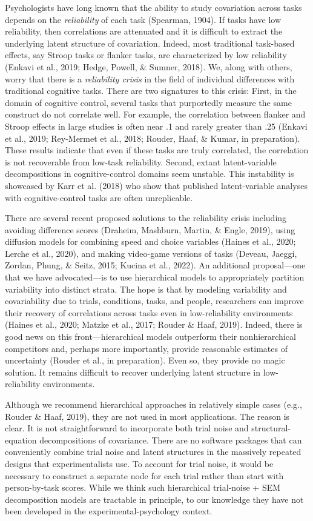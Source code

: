 \documentclass[
  ,man]{apa6}
\begin{document}
Psychologists have long known that the ability to study covariation across tasks depends on the \emph{reliability} of each task (Spearman, 1904). If tasks have low reliability, then correlations are attenuated and it is difficult to extract the underlying latent structure of covariation. Indeed, most traditional task-based effects, say Stroop tasks or flanker tasks, are characterized by low reliability (Enkavi et al., 2019; Hedge, Powell, \& Sumner, 2018). We, along with others, worry that there is a \emph{reliability crisis} in the field of individual differences with traditional cognitive tasks. There are two signatures to this crisis: First, in the domain of cognitive control, several tasks that purportedly measure the same construct do not correlate well. For example, the correlation between flanker and Stroop effects in large studies is often near .1 and rarely greater than .25 (Enkavi et al., 2019; Rey-Mermet et al., 2018; Rouder, Haaf, \& Kumar, in preparation). These results indicate that even if these tasks are truly correlated, the correlation is not recoverable from low-task reliability. Second, extant latent-variable decompositions in cognitive-control domains seem unstable. This instability is showcased by Karr et al. (2018) who show that published latent-variable analyses with cognitive-control tasks are often unreplicable.

There are several recent proposed solutions to the reliability crisis including avoiding difference scores (Draheim, Mashburn, Martin, \& Engle, 2019), using diffusion models for combining speed and choice variables (Haines et al., 2020; Lerche et al., 2020), and making video-game versions of tasks (Deveau, Jaeggi, Zordan, Phung, \& Seitz, 2015; Kucina et al., 2022). An additional proposal---one that we have advocated---is to use hierarchical models to appropriately partition variability into distinct strata. The hope is that by modeling variability and covariability due to trials, conditions, tasks, and people, researchers can improve their recovery of correlations across tasks even in low-reliability environments (Haines et al., 2020; Matzke et al., 2017; Rouder \& Haaf, 2019). Indeed, there is good news on this front---hierarchical models outperform their nonhierarchical competitors and, perhaps more importantly, provide reasonable estimates of uncertainty (Rouder et al., in preparation). Even so, they provide no magic solution. It remains difficult to recover underlying latent structure in low-reliability environments.

Although we recommend hierarchical approaches in relatively simple cases (e.g., Rouder \& Haaf, 2019), they are not used in most applications. The reason is clear. It is not straightforward to incorporate both trial noise and structural-equation decompositions of covariance. There are no software packages that can conveniently combine trial noise and latent structures in the massively repeated designs that experimentalists use. To account for trial noise, it would be necessary to construct a separate node for each trial rather than start with person-by-task scores. While we think such hierarchical trial-noise + SEM decomposition models are tractable in principle, to our knowledge they have not been developed in the experimental-psychology context.
\end{document}

